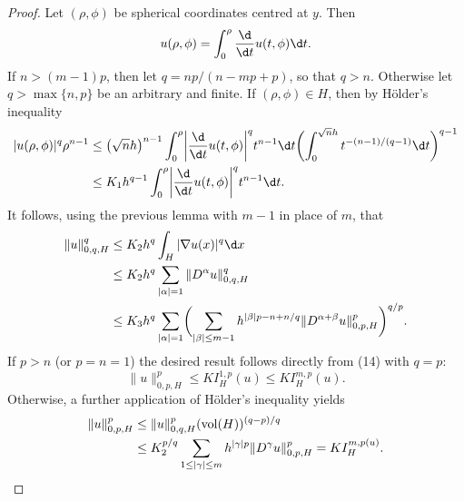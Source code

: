 \begin{proof}
  Let $(\rho,\phi)$ be spherical coordinates centred at $y$. Then
  \[ u(\rho,\phi)  = \int_0^\rho \frac{\d}{\d t} u(t,\phi) \d t. \]
  If $n>(m-1)p$, then let $q = np/(n-mp+p)$, so that $q>n$.
  Otherwise let $q>\max\{n,p\}$ be an arbitrary and finite. If $(\rho,\phi)\in H$,
  then by H\"older's inequality
  \begin{align*}
    |u(\rho,\phi)|^q \rho^{n-1}
    & \leq \bigl(\sqrt n h\bigr)^{n-1} \int_0^\rho \biggl|\frac{\d}{\d t} u(t,\phi)\biggr|^q
      t^{n-1} \d t \biggl(\int_0^{\sqrt n h} t^{-(n-1)/(q-1)} \d t\biggr)^{q-1} \\
    & \leq K_1 h^{q-1} \int_0^\rho \biggl|\frac{\d}{\d t} u(t,\phi)\biggr|^q t^{n-1} \d t.
  \end{align*}
  It follows, using the previous lemma with $m-1$ in place of $m$, that
  \begin{equation}\label{eq:6.14}
    \begin{aligned}
      \|u\|_{0,q,H}^q
      & \leq K_2 h^q \int_H |\nabla u(x)|^q \d x \\
      & \leq K_2 h^q \sum_{|\alpha|=1} \|D^\alpha u\|_{0,q,H}^q \\
      & \leq K_3 h^q \sum_{|\alpha|=1} \biggl(\sum_{|\beta|\leq m-1}
          h^{|\beta|p-n+n/q} \|D^{\alpha+\beta} u\|_{0,p,H}^p \biggr)^{q/p}.
    \end{aligned}
  \end{equation}
  If $p>n$ (or $p=n=1$) the desired result follows directly from (14)
  with $q=p$:
  \[ \|u\|_{0,p,H}^p \leq K I_H^{1,p}(u) \leq K I_H^{m,p}(u). \]
  Otherwise, a further application of H\"older's inequality yields
  \begin{align*}
    \|u\|_{0,p,H}^p
    & \leq \|u\|_{0,q,H}^p (\operatorname{vol}(H))^{(q-p)/q} \\
    & \leq K_2^{p/q} \sum_{1\leq |\gamma|\leq m} h^{|\gamma|p} \|D^\gamma u\|_{0,p,H}^p
        = K I_H^{m,p(u)}. \qedhere
  \end{align*}
\end{proof}


